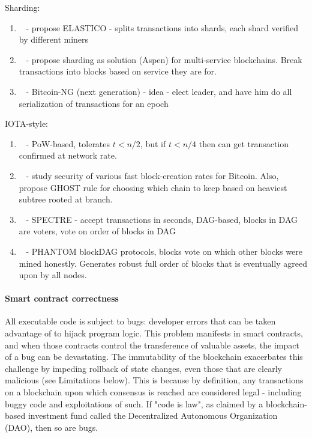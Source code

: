 Sharding:
\begin{enumerate}
\item ~\cite{CCS:LNZBGS16} - propose ELASTICO - splits transactions into shards, each shard verified by different miners
\item ~\cite{FC:GenRenSir17} - propose sharding as solution (Aspen) for multi-service blockchains.  Break transactions into blocks based on service they are for.
\item ~\cite{NSDI:EGSR16} - Bitcoin-NG (next generation) - idea - elect leader, and have him do all serialization of transactions for an epoch
\end{enumerate}
IOTA-style:
\begin{enumerate}
\item~\cite{EC:PasShi18} - PoW-based, tolerates $t<n/2$, but if $t<n/4$ then can get transaction confirmed at network rate.
\item ~\cite{FC:SomZoh15} - study security of various fast block-creation rates for Bitcoin.  Also, propose GHOST rule for choosing which chain to keep based on heaviest subtree rooted at branch.
\item ~\cite{ePrint:SomLewZoh16} - SPECTRE - accept transactions in seconds, DAG-based, blocks in DAG are voters, vote on order of blocks in DAG
\item ~\cite{eprint:SomZoh18} - PHANTOM blockDAG protocols, blocks vote on which other blocks were mined honestly.  Generates robust full order of blocks that is eventually agreed upon by all nodes.
\end{enumerate}

\paragraph{Smart contract correctness}
All executable code is subject to bugs: developer errors that can be taken advantage of to hijack program logic. This problem manifests in smart contracts, and when those contracts control the transference of valuable assets, the impact of a bug can be devastating. The immutability of the blockchain exacerbates this challenge by impeding rollback of state changes, even those that are clearly malicious (see Limitations below). This is because by definition, any transactions on a blockchain upon which consensus is reached are considered legal - including buggy code and exploitations of such. If "code is law", as claimed by a blockchain-based investment fund called the Decentralized Autonomous Organization (DAO), then so are bugs. 

